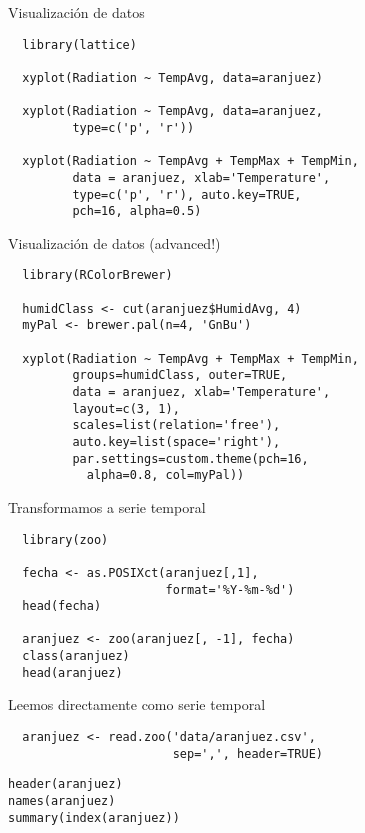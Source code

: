 \documentclass[xcolor={usenames,svgnames,dvipsnames}]{beamer}
\begin{document}
\begin{frame}[fragile,label=sec-1-4]{Visualización de datos}
 \lstset{language=R,label= ,caption= ,numbers=none}
\begin{lstlisting}
  library(lattice)
  
  xyplot(Radiation ~ TempAvg, data=aranjuez)
  
  xyplot(Radiation ~ TempAvg, data=aranjuez,
         type=c('p', 'r'))
  
  xyplot(Radiation ~ TempAvg + TempMax + TempMin,
         data = aranjuez, xlab='Temperature',
         type=c('p', 'r'), auto.key=TRUE,
         pch=16, alpha=0.5)
\end{lstlisting}
\end{frame}

\begin{frame}[fragile,label=sec-1-5]{Visualización de datos (advanced!)}
 \lstset{language=R,label= ,caption= ,numbers=none}
\begin{lstlisting}
  library(RColorBrewer)
  
  humidClass <- cut(aranjuez$HumidAvg, 4)
  myPal <- brewer.pal(n=4, 'GnBu')
  
  xyplot(Radiation ~ TempAvg + TempMax + TempMin,
         groups=humidClass, outer=TRUE,
         data = aranjuez, xlab='Temperature',
         layout=c(3, 1),
         scales=list(relation='free'),
         auto.key=list(space='right'),
         par.settings=custom.theme(pch=16,
           alpha=0.8, col=myPal))
\end{lstlisting}
\end{frame}
\begin{frame}[fragile,label=sec-1-6]{Transformamos a serie temporal}
 \lstset{language=R,label= ,caption= ,numbers=none}
\begin{lstlisting}
  library(zoo)
  
  fecha <- as.POSIXct(aranjuez[,1],
                      format='%Y-%m-%d')
  head(fecha)
  
  aranjuez <- zoo(aranjuez[, -1], fecha)
  class(aranjuez)
  head(aranjuez)
\end{lstlisting}
\end{frame}

\begin{frame}[fragile,label=sec-1-7]{Leemos directamente como serie temporal}
 \lstset{language=R,label= ,caption= ,numbers=none}
\begin{lstlisting}
  aranjuez <- read.zoo('data/aranjuez.csv',
                       sep=',', header=TRUE)
\end{lstlisting}

\lstset{language=R,label= ,caption= ,numbers=none}
\begin{lstlisting}
header(aranjuez)
names(aranjuez)
summary(index(aranjuez))
\end{lstlisting}
\end{frame}
\end{document}
